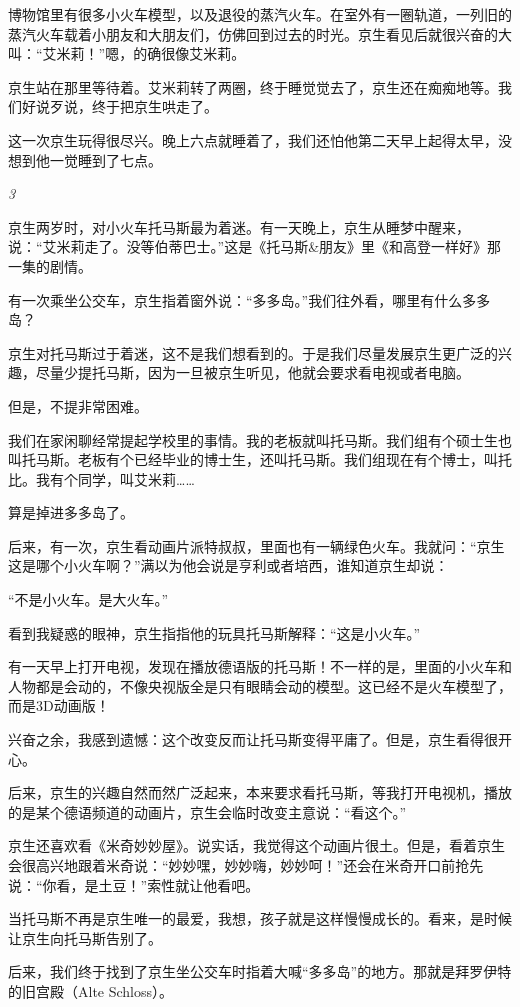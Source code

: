 \documentclass[twoside,openright,headings=optiontohead]{ctexbook} %
\begin{document}
{博物馆里有很多小火车模型，以及退役的蒸汽火车。在室外有一圈轨道，一列旧的蒸汽火车载着小朋友和大朋友们，仿佛回到过去的时光。京生看见后就很兴奋的大叫：``艾米莉！''嗯，的确很像艾米莉。

京生站在那里等待着。艾米莉转了两圈，终于睡觉觉去了，京生还在痴痴地等。我们好说歹说，终于把京生哄走了。

这一次京生玩得很尽兴。晚上六点就睡着了，我们还怕他第二天早上起得太早，没想到他一觉睡到了七点。

\emph{3}

京生两岁时，对小火车托马斯最为着迷。有一天晚上，京生从睡梦中醒来，说：``艾米莉走了。没等伯蒂巴士。''这是《托马斯\&朋友》里《和高登一样好》那一集的剧情。

有一次乘坐公交车，京生指着窗外说：``多多岛。''我们往外看，哪里有什么多多岛？

京生对托马斯过于着迷，这不是我们想看到的。于是我们尽量发展京生更广泛的兴趣，尽量少提托马斯，因为一旦被京生听见，他就会要求看电视或者电脑。

但是，不提非常困难。

我们在家闲聊经常提起学校里的事情。我的老板就叫托马斯。我们组有个硕士生也叫托马斯。老板有个已经毕业的博士生，还叫托马斯。我们组现在有个博士，叫托比。我有个同学，叫艾米莉\ldots{}\ldots{}

算是掉进多多岛了。

后来，有一次，京生看动画片派特叔叔，里面也有一辆绿色火车。我就问：``京生这是哪个小火车啊？''满以为他会说是亨利或者培西，谁知道京生却说：

``不是小火车。是大火车。''

看到我疑惑的眼神，京生指指他的玩具托马斯解释：``这是小火车。''

有一天早上打开电视，发现在播放德语版的托马斯！不一样的是，里面的小火车和人物都是会动的，不像央视版全是只有眼睛会动的模型。这已经不是火车模型了，而是3D动画版！

兴奋之余，我感到遗憾：这个改变反而让托马斯变得平庸了。但是，京生看得很开心。

后来，京生的兴趣自然而然广泛起来，本来要求看托马斯，等我打开电视机，播放的是某个德语频道的动画片，京生会临时改变主意说：``看这个。''

京生还喜欢看《米奇妙妙屋》。说实话，我觉得这个动画片很土。但是，看着京生会很高兴地跟着米奇说：``妙妙嘿，妙妙嗨，妙妙呵！''还会在米奇开口前抢先说：``你看，是土豆！''索性就让他看吧。

当托马斯不再是京生唯一的最爱，我想，孩子就是这样慢慢成长的。看来，是时候让京生向托马斯告别了。

后来，我们终于找到了京生坐公交车时指着大喊``多多岛''的地方。那就是拜罗伊特的旧宫殿（Alte
Schloss）。

}
\end{document}
